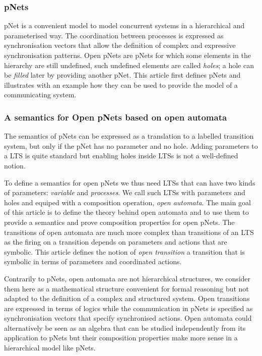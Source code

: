 \documentclass{elsarticle}
\begin{document}
\subsubsection*{pNets}
pNet is a convenient model to model concurrent systems in a hierarchical and parameterised way. The coordination between processes is expressed as synchronisation vectors that allow the definition of complex and expressive synchronisation patterns.
Open pNets are pNets for which some elements in the hierarchy are still undefined, such undefined elements are called \emph{holes}; a hole can be \emph{filled} later by providing another pNet.
This article first defines pNets and illustrates with an example how they can be used to provide the model of a communicating system. 

\subsubsection{A semantics for Open pNets based on open automata}
The semantics of pNets can be expressed as a translation to a labelled transition system, but only if the pNet has no parameter and no hole. Adding parameters to a LTS is quite standard but enabling holes inside LTSs is not a well-defined notion.

To define a semantics for open pNets we thus need LTSs that can have two kinds of parameters: \emph{variable} and \emph{processes}. We call such LTSs with parameters and holes and equiped with a composition operation, \emph{open automata}. The main goal of this article is to define the theory behind open automata and to use them to provide a semantics and prove composition properties for open pNets.
  The transitions of open automata are much more complex than transitions of an LTS as the firing on a transition depends on parameters and actions that are symbolic. This article defines the notion of \emph{open transition} a transition that is symbolic in terms of parameters and coordinated actions.

Contrarily to pNets, open automata are not hierarchical structures, we consider them here as a mathematical structure convenient for formal reasoning but not adapted to the definition of a complex and structured system. 
Open transitions are expressed in terms of logics while the communication in pNets is specified as synchronisation vectors that specify synchronised actions.
Open automata could alternatively be  seen as an algebra that can be studied independently from its application to pNets but their composition properties make more sense in a hierarchical model like pNets.
\end{document}
